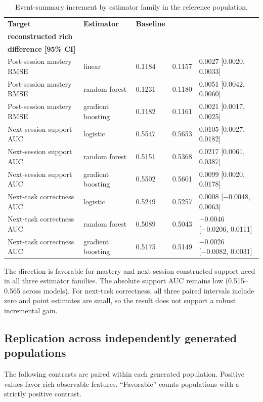 \documentclass[11pt]{article}
\makeatletter
\newcommand{\two}[2]{\begin{tabular}[t]{@{}l@{}}#1\\{}#2\end{tabular}}
\makeatother
\begin{document}
\begin{table}[htbp]
\centering\small
\caption{Event-summary increment by estimator family in the reference population.}
\label{tab:estimators}
\setlength{\tabcolsep}{4pt}
\begin{tabularx}{\linewidth}{@{}>{\raggedright\arraybackslash}Xllll@{}}
\toprule
\textbf{Target} & \textbf{Estimator} & \textbf{Baseline} & \two{\textbf{Event-}}{\textbf{reconstructed rich}} & \two{\textbf{Favorable}}{\textbf{difference [95\% CI]}} \\
\midrule
Post-session mastery RMSE & linear & 0.1184 & 0.1157 & 0.0027 [0.0020, 0.0033] \\
Post-session mastery RMSE & random forest & 0.1231 & 0.1180 & 0.0051 [0.0042, 0.0060] \\
Post-session mastery RMSE & gradient boosting & 0.1182 & 0.1161 & 0.0021 [0.0017, 0.0025] \\
\addlinespace
Next-session support AUC & logistic & 0.5547 & 0.5653 & 0.0105 [0.0027, 0.0182] \\
Next-session support AUC & random forest & 0.5151 & 0.5368 & 0.0217 [0.0061, 0.0387] \\
Next-session support AUC & gradient boosting & 0.5502 & 0.5601 & 0.0099 [0.0020, 0.0178] \\
\addlinespace
Next-task correctness AUC & logistic & 0.5249 & 0.5257 & 0.0008 [−0.0048, 0.0063] \\
Next-task correctness AUC & random forest & 0.5089 & 0.5043 & −0.0046 [−0.0206, 0.0111] \\
Next-task correctness AUC & gradient boosting & 0.5175 & 0.5149 & −0.0026 [−0.0082, 0.0031] \\
\bottomrule
\end{tabularx}
\end{table}

The direction is favorable for mastery and next-session constructed support need in all three estimator families. The absolute support AUC remains low (0.515–0.565 across models). For next-task correctness, all three paired intervals include zero and point estimates are small, so the result does not support a robust incremental gain.

\subsection{Replication across independently generated populations}

The following contrasts are paired within each generated population. Positive values favor rich-observable features. “Favorable” counts populations with a strictly positive contrast.
\end{document}
